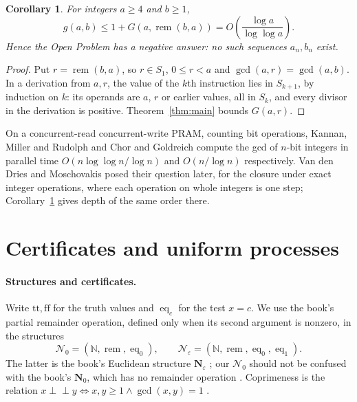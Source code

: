 \documentclass[11pt]{article}
\newtheorem{corollary}[theorem]{Corollary}
\theoremstyle{remark}
\newcommand{\rem}{\operatorname{rem}}
\newcommand{\eq}{\operatorname{eq}}
\newcommand{\coprime}{\perp\!\!\!\perp}
\begin{document}
\begin{corollary}\label{cor:closure-depth}
For integers $a\geq4$ and $b\geq1$,
\[
g(a,b)\leq1+G(a,\rem(b,a))
 =O\left(\frac{\log a}{\log\log a}\right).
\]
Hence the Open Problem has a negative answer: no such sequences $a_n,b_n$
exist.
\end{corollary}
\begin{proof}
Put $r=\rem(b,a)$, so $r\in S_1$, $0\leq r<a$ and $\gcd(a,r)=\gcd(a,b)$.
In a derivation from $a,r$, the value of the $k$th instruction lies in
$S_{k+1}$, by induction on $k$: its operands are $a$, $r$ or earlier values,
all in $S_k$, and every divisor in the derivation is positive.
Theorem~\ref{thm:main} bounds $G(a,r)$.
\end{proof}
On a concurrent-read concurrent-write PRAM, counting bit operations,
Kannan, Miller and Rudolph \cite{kmr1987} and Chor and Goldreich
\cite{chorgoldreich1990} compute the gcd of $n$-bit integers in parallel
time $O(n\log\log n/\log n)$ and $O(n/\log n)$ respectively. Van den Dries and Moschovakis posed
their question later, for the closure under exact integer operations, where
each operation on whole integers is one step;
Corollary~\ref{cor:closure-depth} gives depth of the same order there.

\section{Certificates and uniform processes}\label{sec:certificates}
\paragraph{Structures and certificates.}
Write $\mathrm{tt},\mathrm{ff}$ for the truth values and $\eq_c$ for the
test $x=c$. We use the book's partial remainder operation, defined only
when its second argument is nonzero, in the structures
\[
\mathcal N_0=(\mathbb N,\rem,\eq_0),\qquad
\mathcal N_\varepsilon=(\mathbb N,\rem,\eq_0,\eq_1).
\]
The latter is the book's Euclidean structure $\mathbf N_\varepsilon$
\cite[(1C-10), p.~24]{moschovakis2019}; our $\mathcal N_0$ should not
be confused with the book's $\mathbf N_0$, which has no remainder operation
\cite[p.~171]{moschovakis2019}.
Coprimeness is the relation
$x\coprime y\iff x,y\geq1\wedge\gcd(x,y)=1$
\cite[\S1A]{moschovakis2019}.
\end{document}
